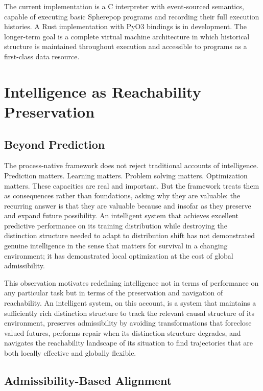 \documentclass[11pt, oneside]{book}
\theoremstyle{definition}
\theoremstyle{remark}
\begin{document}
The current implementation is a C interpreter with event-sourced semantics, capable of executing basic Spherepop programs and recording their full execution histories. A Rust implementation with PyO3 bindings is in development. The longer-term goal is a complete virtual machine architecture in which historical structure is maintained throughout execution and accessible to programs as a first-class data resource.

\chapter{Intelligence as Reachability Preservation}

\section{Beyond Prediction}

The process-native framework does not reject traditional accounts of intelligence. Prediction matters. Learning matters. Problem solving matters. Optimization matters. These capacities are real and important. But the framework treats them as consequences rather than foundations, asking why they are valuable: the recurring answer is that they are valuable because and insofar as they preserve and expand future possibility. An intelligent system that achieves excellent predictive performance on its training distribution while destroying the distinction structure needed to adapt to distribution shift has not demonstrated genuine intelligence in the sense that matters for survival in a changing environment; it has demonstrated local optimization at the cost of global admissibility.

This observation motivates redefining intelligence not in terms of performance on any particular task but in terms of the preservation and navigation of reachability. An intelligent system, on this account, is a system that maintains a sufficiently rich distinction structure to track the relevant causal structure of its environment, preserves admissibility by avoiding transformations that foreclose valued futures, performs repair when its distinction structure degrades, and navigates the reachability landscape of its situation to find trajectories that are both locally effective and globally flexible.

\section{Admissibility-Based Alignment}
\end{document}
